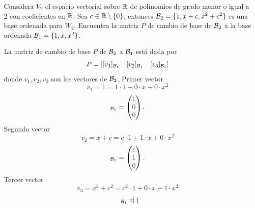 \documentclass[12pt,a4paper]{article}
\begin{document}
    \begin{mdframed}[style=mdbluebox,frametitle={Ejercicio 3}]
        Considera $V_{2}$ el espacio vectorial sobre $\mathbb{R}$ de polinomios de grado menor o igual a 2 con coeficientes en $\mathbb{R}$. Sea
        $c\in\mathbb{R}\setminus\{0\}$, entonces $\mathcal{B}_{2}=\{1,x+c,x^{2}+c^{2}\}$ es una base ordenada para $W_{2}$. Encuentra la matriz $P$
        de cambio de base de $\mathcal{B}_{2}$ a la base ordenada $\mathcal{B}_{1}=\{1,x,x^{2}\}$.
    \end{mdframed}

    \begin{solucion}
        La matriz de cambio de base $P$ de $\mathcal{B}_{2}$ a $\mathcal{B}_{1}$ está dada por
        \begin{equation*}
            P=[[v_{1}]_{\mathcal{B}_{1}}\quad[v_{2}]_{\mathcal{B}_{1}}\quad[v_{3}]_{\mathcal{B}_{1}}]
        \end{equation*}
        donde $v_{1},v_{2},v_{3}$ son los vectores de $\mathcal{B}_{2}$. Primer vector
        \begin{equation*}
            v_{1}=1=1\cdot1+0\cdot x+0\cdot x^{2}
        \end{equation*}
        \begin{equation*}
            [1]_{\BB_{1}}=
            \begin{pmatrix}
                1\\
                0\\
                0
            \end{pmatrix}.
        \end{equation*}
        Segundo vector
        \begin{equation*}
            v_{2}=x+c=c\cdot1+1\cdot x+0\cdot x^{2}
        \end{equation*}
        \begin{equation*}
            [x+c]_{\BB_{1}}=
            \begin{pmatrix}
                c\\
                1\\
                0
            \end{pmatrix}.
        \end{equation*}
        Tercer vector
        \begin{equation*}
            v_{3}=x^{2}+c^{2}=c^{2}\cdot1+0\cdot x+1\cdot x^{2}
        \end{equation*}
        \begin{equation*}
            [x^{2}+c^{2}]_{\BB_{1}}=
            \begin{pmatrix}

\end{pmatrix}
\end{equation*}
\end{solucion}
\end{document}
